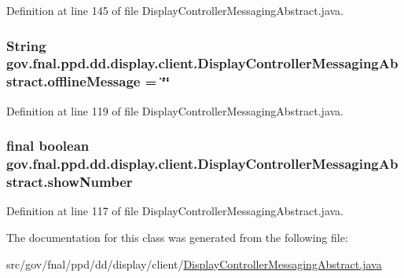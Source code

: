 Definition at line 145 of file Display\-Controller\-Messaging\-Abstract.\-java.

\hypertarget{classgov_1_1fnal_1_1ppd_1_1dd_1_1display_1_1client_1_1DisplayControllerMessagingAbstract_a6c6ececd9f4e0f03ff305dedcc8d81cf}{
\subsubsection[{offline\-Message}]{\setlength{\rightskip}{0pt plus 5cm}String gov.\-fnal.\-ppd.\-dd.\-display.\-client.\-Display\-Controller\-Messaging\-Abstract.\-offline\-Message = \char`\"{}\char`\"{}\hspace{0.3cm}{\ttfamily [protected]}}}\label{classgov_1_1fnal_1_1ppd_1_1dd_1_1display_1_1client_1_1DisplayControllerMessagingAbstract_a6c6ececd9f4e0f03ff305dedcc8d81cf}


Definition at line 119 of file Display\-Controller\-Messaging\-Abstract.\-java.

\hypertarget{classgov_1_1fnal_1_1ppd_1_1dd_1_1display_1_1client_1_1DisplayControllerMessagingAbstract_aca138d2835d0f3794bc86261ad550f18}{
\subsubsection[{show\-Number}]{\setlength{\rightskip}{0pt plus 5cm}final boolean gov.\-fnal.\-ppd.\-dd.\-display.\-client.\-Display\-Controller\-Messaging\-Abstract.\-show\-Number\hspace{0.3cm}{\ttfamily [protected]}}}\label{classgov_1_1fnal_1_1ppd_1_1dd_1_1display_1_1client_1_1DisplayControllerMessagingAbstract_aca138d2835d0f3794bc86261ad550f18}


Definition at line 117 of file Display\-Controller\-Messaging\-Abstract.\-java.



The documentation for this class was generated from the following file\-:\begin{DoxyCompactItemize}
\item 
src/gov/fnal/ppd/dd/display/client/\hyperlink{DisplayControllerMessagingAbstract_8java}{Display\-Controller\-Messaging\-Abstract.\-java}\end{DoxyCompactItemize}
